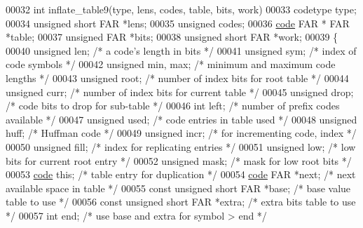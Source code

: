 \begin{DoxyCode}
00032 \textcolor{keywordtype}{int} inflate\_table9(type, lens, codes, table, bits, work)
00033 codetype type;
00034 \textcolor{keywordtype}{unsigned} \textcolor{keywordtype}{short} FAR *lens;
00035 \textcolor{keywordtype}{unsigned} codes;
00036 \hyperlink{structcode}{code} FAR * FAR *table;
00037 \textcolor{keywordtype}{unsigned} FAR *bits;
00038 \textcolor{keywordtype}{unsigned} \textcolor{keywordtype}{short} FAR *work;
00039 \{
00040     \textcolor{keywordtype}{unsigned} len;               \textcolor{comment}{/* a code's length in bits */}
00041     \textcolor{keywordtype}{unsigned} sym;               \textcolor{comment}{/* index of code symbols */}
00042     \textcolor{keywordtype}{unsigned} min, max;          \textcolor{comment}{/* minimum and maximum code lengths */}
00043     \textcolor{keywordtype}{unsigned} root;              \textcolor{comment}{/* number of index bits for root table */}
00044     \textcolor{keywordtype}{unsigned} curr;              \textcolor{comment}{/* number of index bits for current table */}
00045     \textcolor{keywordtype}{unsigned} drop;              \textcolor{comment}{/* code bits to drop for sub-table */}
00046     \textcolor{keywordtype}{int} left;                   \textcolor{comment}{/* number of prefix codes available */}
00047     \textcolor{keywordtype}{unsigned} used;              \textcolor{comment}{/* code entries in table used */}
00048     \textcolor{keywordtype}{unsigned} huff;              \textcolor{comment}{/* Huffman code */}
00049     \textcolor{keywordtype}{unsigned} incr;              \textcolor{comment}{/* for incrementing code, index */}
00050     \textcolor{keywordtype}{unsigned} fill;              \textcolor{comment}{/* index for replicating entries */}
00051     \textcolor{keywordtype}{unsigned} low;               \textcolor{comment}{/* low bits for current root entry */}
00052     \textcolor{keywordtype}{unsigned} mask;              \textcolor{comment}{/* mask for low root bits */}
00053     \hyperlink{structcode}{code} \textcolor{keyword}{this};                  \textcolor{comment}{/* table entry for duplication */}
00054     \hyperlink{structcode}{code} FAR *next;             \textcolor{comment}{/* next available space in table */}
00055     \textcolor{keyword}{const} \textcolor{keywordtype}{unsigned} \textcolor{keywordtype}{short} FAR *base;     \textcolor{comment}{/* base value table to use */}
00056     \textcolor{keyword}{const} \textcolor{keywordtype}{unsigned} \textcolor{keywordtype}{short} FAR *extra;    \textcolor{comment}{/* extra bits table to use */}
00057     \textcolor{keywordtype}{int} end;                    \textcolor{comment}{/* use base and extra for symbol > end */}

\end{DoxyCode}
